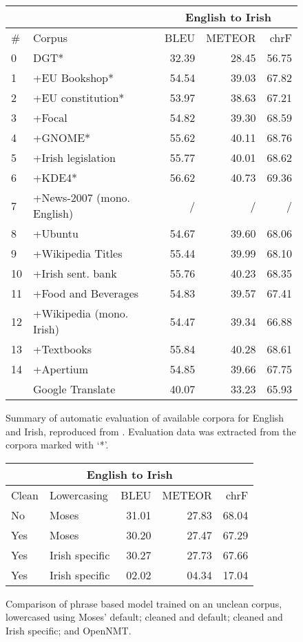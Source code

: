 \begin{figure*}
\begin{center}
\begin{tabular}{|l|l|r|r|r|}
\hline
 &  & \multicolumn{3}{|c|}{English to Irish} \\
\hline
\# & Corpus & BLEU & METEOR & chrF \\
\hline
0 & DGT* & 32.39 & 28.45 & 56.75 \\
1 & +EU Bookshop* & 54.54 & 39.03 & 67.82 \\
2 & +EU constitution* & 53.97 & 38.63 & 67.21 \\
3 & +Focal & 54.82 & 39.30 & 68.59 \\
4 & +GNOME* & 55.62 & 40.11 & 68.76 \\
5 & +Irish legislation & 55.77 & 40.01 & 68.62 \\
6 & +KDE4* & 56.62 & 40.73 & 69.36 \\
7 & +News-2007 (mono. English) & / & / & / \\
8 & +Ubuntu & 54.67 & 39.60 & 68.06 \\
9 & +Wikipedia Titles & 55.44 & 39.99 & 68.10 \\
10 & +Irish sent. bank & 55.76 & 40.23 & 68.35 \\
11 & +Food and Beverages & 54.83 & 39.57 & 67.41 \\
12 & +Wikipedia (mono. Irish) & 54.47 & 39.34 & 66.88 \\
13 & +Textbooks & 55.84 & 40.28 & 68.61 \\
14 & +Apertium & 54.85 & 39.66 & 67.75 \\
\hline
 & Google Translate & 40.07 & 33.23 & 65.93 \\
\hline
\end{tabular}
\end{center}
\caption{Summary of automatic evaluation of available corpora for English and Irish, reproduced from \protect\citet[p. 569]{ARCAN16.9}.
Evaluation data was extracted from the corpora marked with `*'.}
\label{fig:iriseval}
\end{figure*}

\begin{figure*}
\begin{center}
\begin{tabular}{|l|l|r|r|r|}
\hline
\multicolumn{5}{|c|}{English to Irish} \\
\hline
Clean & Lowercasing    & BLEU  & METEOR & chrF \\
\hline
No    & Moses          & 31.01 & 27.83  & 68.04 \\
Yes   & Moses          & 30.20 & 27.47  & 67.29 \\
Yes   & Irish specific & 30.27 & 27.73  & 67.66 \\
\hline
Yes   & Irish specific & 02.02 & 04.34  & 17.04 \\
\hline
\end{tabular}
\end{center}
\caption{Comparison of phrase based model trained on an unclean corpus, lowercased using Moses' default; cleaned and default; cleaned and Irish specific; and OpenNMT.}
\label{fig:tokcleancompare}
\end{figure*}

